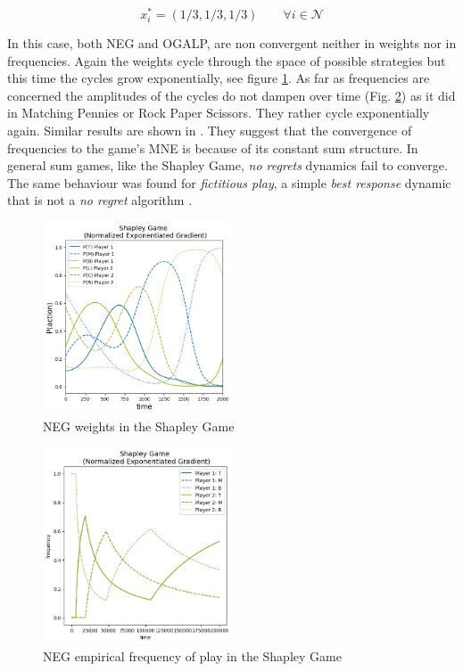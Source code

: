 \begin{equation*}
    x_{i}^{*} = (1/3,1/3,1/3) \qquad \forall i \in \mathcal{N}
\end{equation*}

In this case, both NEG and OGALP, are non convergent neither in weights nor in frequencies. Again the weights cycle through the space of possible strategies but this time the cycles grow exponentially, see figure \ref{fig:Shapley1}. As far as frequencies are concerned the amplitudes of the cycles do not dampen over time (Fig. \ref{fig:Shapley2}) as it did in Matching Pennies or Rock Paper Scissors. They rather cycle exponentially again. Similar results are shown in \cite{jafari}. They suggest that the convergence of frequencies to the game's MNE is because of its constant sum structure. In general sum games, like the Shapley Game, \textit{no regrets} dynamics fail to converge. The same behaviour was found for \textit{fictitious play}, a simple \textit{best response} dynamic that is not a \textit{no regret} algorithm \cite{jafari}.

\begin{figure}[H]
    \centering
    \includegraphics[width=0.5\textwidth]{logos/Shapley1.png}
    \caption{NEG weights in the Shapley Game}
    \label{fig:Shapley1}
\end{figure}

\begin{figure}[H]
    \centering
    \includegraphics[width=0.5\textwidth]{logos/Shapley2.png}
    \caption{NEG empirical frequency of play in the Shapley Game}
    \label{fig:Shapley2}
\end{figure}



